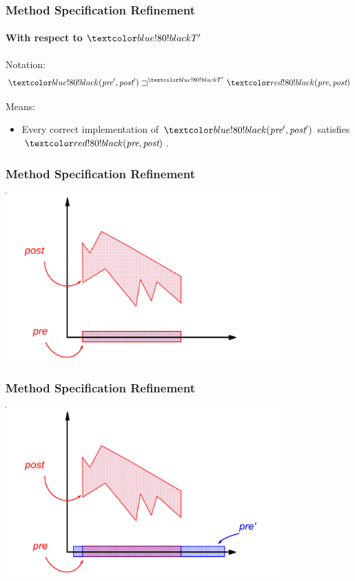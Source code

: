 \begin{frame}
\frametitle{Method Specification Refinement}
\framesubtitle{With respect to $\BLUETP$}

Notation:
\begin{displaymath}
\BLUE{(\pre',\post')} \sqsupset^{\BLUETP} \RED{(\pre,\post)}
\end{displaymath}

Means:
\begin{itemize}
\item
Every correct implementation of $\BLUE{(\pre',\post')}$ satisfies
$\RED{(\pre,\post)}$.
\end{itemize}
\end{frame}

\begin{frame}
\frametitle{Method Specification Refinement}
\includegraphics[width=4.25in]{meth-refine1}
\end{frame}

\begin{frame}
\frametitle{Method Specification Refinement}
\transdissolve[duration=0.2]
\includegraphics[width=4.25in]{meth-refine2}
\end{frame}

